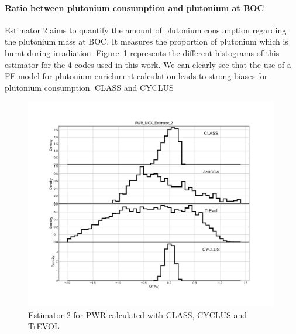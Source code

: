\paragraph{Ratio between plutonium consumption and plutonium at BOC}
Estimator 2 aims to quantify the amount of plutonium consumption regarding the plutonium mass at BOC. It measures the proportion of plutonium which is burnt during irradiation. Figure~\ref{fig:Est2_PWR} represents the different histograms of this estimator for the 4 codes used in this work. We can clearly see that the use of a FF model for plutonium enrichment calculation leads to strong biases for plutonium consumption. CLASS and CYCLUS  
\begin{figure}[h]
	\begin{center}
		\includegraphics[width = 0.99\textwidth]{../../Feature_1/RAW_DATA/FIG/PWR_MOX_Estimator_2.pdf}
		\caption{Estimator 2 for PWR calculated with CLASS, CYCLUS and TrEVOL}
		\label{fig:Est2_PWR}
	\end{center}
\end{figure}



